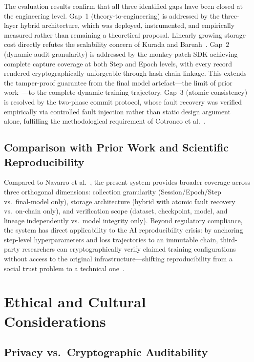 \documentclass[10pt,twocolumn]{article}
\begin{document}
The evaluation results confirm that all three identified gaps have been closed at the
engineering level. Gap~1 (theory-to-engineering) is addressed by the three-layer hybrid
architecture, which was deployed, instrumented, and empirically measured rather than
remaining a theoretical proposal. Linearly growing storage cost directly refutes the
scalability concern of Kurada and Baruah~\cite{kurada2023}. Gap~2 (dynamic audit
granularity) is addressed by the monkey-patch SDK achieving complete capture coverage
at both Step and Epoch levels, with every record rendered cryptographically unforgeable
through hash-chain linkage. This extends the tamper-proof guarantee from the final model
artefact---the limit of prior work~\cite{navarro2023}---to the complete dynamic training
trajectory. Gap~3 (atomic consistency) is resolved by the two-phase commit protocol,
whose fault recovery was verified empirically via controlled fault injection rather than
static design argument alone, fulfilling the methodological requirement of Cotroneo et
al.~\cite{cotroneo2022}.

\subsection{Comparison with Prior Work and Scientific Reproducibility}

Compared to Navarro et al.~\cite{navarro2023}, the present system provides broader
coverage across three orthogonal dimensions: collection granularity (Session/Epoch/Step
vs.\ final-model only), storage architecture (hybrid with atomic fault recovery vs.\
on-chain only), and verification scope (dataset, checkpoint, model, and lineage
independently vs.\ model integrity only). Beyond regulatory compliance, the system
has direct applicability to the AI reproducibility crisis: by anchoring step-level
hyperparameters and loss trajectories to an immutable chain, third-party researchers
can cryptographically verify claimed training configurations without access to the
original infrastructure---shifting reproducibility from a social trust problem to a
technical one~\cite{idowu2024}.

\section{Ethical and Cultural Considerations}

\subsection{Privacy vs.\ Cryptographic Auditability}
\end{document}

